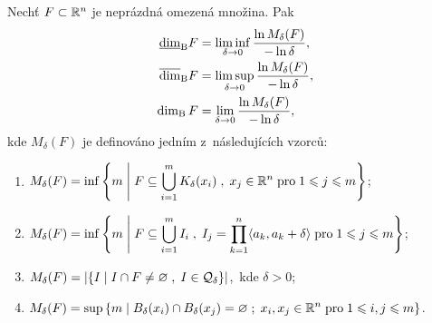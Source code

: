 \begin{theorem}\label{thm:ekvivalentni-def-box-counting-dimenze}
    Nechť $F\subset \mathbb{R}^n$ je neprázdná omezená množina. Pak
    \begin{align*}
        \underline{\dim}_\textup{B}{F}&=\liminf_{\delta\to 0}\dfrac{\ln{M_\delta(F)}}{-\ln{\delta}},\\
        \overline{\dim}_\textup{B}{F}&=\limsup_{\delta\to 0}\dfrac{\ln{M_\delta(F)}}{-\ln{\delta}},\\
        \operatorname{dim_B}{F}&=\lim_{\delta\to 0}\dfrac{\ln{M_\delta(F)}}{-\ln{\delta}},
    \end{align*}
    kde $M_\delta(F)$ je definováno jedním z~následujících vzorců:
    \begin{enumerate}[label=(\roman*)]
        \item\label{thm:pokryti-delta-uz-koulemi} $\displaystyle M_\delta(F)=\inf\left\{m\;\middle|\;F\subseteq\bigcup\limits_{i=1}^m K_\delta(x_i)\;,\;x_j\in\mathbb{R}^n\;\text{pro}\;1\leqslant j\leqslant m\right\}$;
        \item\label{thm:pokryti-delta-kvadry} $\displaystyle M_\delta(F)=\inf\left\{m\;\middle|\;F\subseteq\bigcup\limits_{i=1}^m I_i\;,\;I_j=\prod_{k=1}^{n}\langle a_k,a_k+\delta\rangle\;\text{pro}\;1\leqslant j\leqslant m\right\}$;
        \item\label{thm:pokryti-delta-sit} $\displaystyle M_\delta(F)=\left|\left\{I\;\middle|\;I\cap F\neq\varnothing\;,\;I\in\mathcal{Q}_\delta\right\}\right|$,~kde $\delta>0$;
        \item\label{thm:pokryti-delta-dis-ot-koulemi} $\displaystyle M_\delta(F)=\sup\left\{m\;\middle|\;B_\delta(x_i)\cap B_\delta(x_j)=\varnothing\;;\;x_i,x_j\in\mathbb{R}^n\;\text{pro}\;1\leqslant i,j\leqslant m\right\}$.
    \end{enumerate}
\end{theorem}

